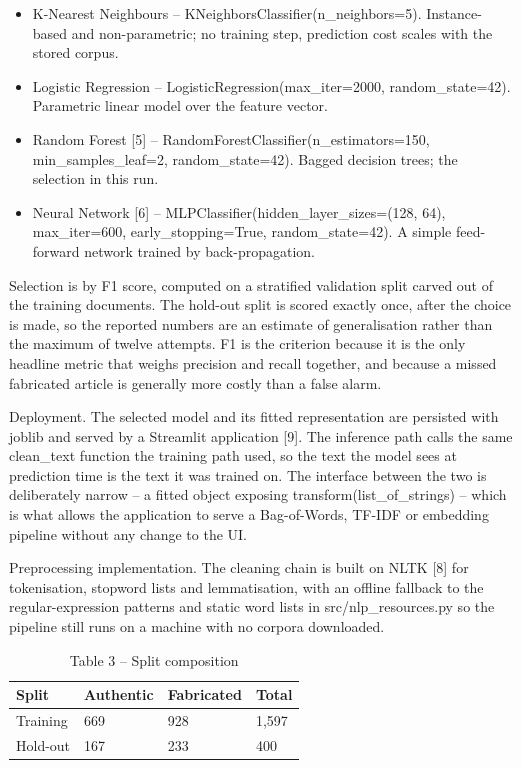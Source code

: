 \documentclass[conference,a4paper]{IEEEtran}
\begin{document}
\begin{itemize}
  \item K-Nearest Neighbours -- KNeighborsClassifier(n\_neighbors=5). Instance-based and non-parametric; no training step, prediction cost scales with the stored corpus.
  \item Logistic Regression -- LogisticRegression(max\_iter=2000, random\_state=42). Parametric linear model over the feature vector.
  \item Random Forest [5] -- RandomForestClassifier(n\_estimators=150, min\_samples\_leaf=2, random\_state=42). Bagged decision trees; the selection in this run.
  \item Neural Network [6] -- MLPClassifier(hidden\_layer\_sizes=(128, 64), max\_iter=600, early\_stopping=True, random\_state=42). A simple feed-forward network trained by back-propagation.
\end{itemize}

Selection is by F1 score, computed on a stratified validation split carved out of the training documents. The hold-out split is scored exactly once, after the choice is made, so the reported numbers are an estimate of generalisation rather than the maximum of twelve attempts. F1 is the criterion because it is the only headline metric that weighs precision and recall together, and because a missed fabricated article is generally more costly than a false alarm.

Deployment. The selected model and its fitted representation are persisted with joblib and served by a Streamlit application [9]. The inference path calls the same clean\_text function the training path used, so the text the model sees at prediction time is the text it was trained on. The interface between the two is deliberately narrow -- a fitted object exposing transform(list\_of\_strings) -- which is what allows the application to serve a Bag-of-Words, TF-IDF or embedding pipeline without any change to the UI.

Preprocessing implementation. The cleaning chain is built on NLTK [8] for tokenisation, stopword lists and lemmatisation, with an offline fallback to the regular-expression patterns and static word lists in src/nlp\_resources.py so the pipeline still runs on a machine with no corpora downloaded.

\begin{table}[!t]
  \centering
  \small
  \caption{Table 3 -- Split composition}
  \label{tab:table3splitcomposition}
  \begin{tabular}{llll}
    \toprule
    Split & Authentic & Fabricated & Total \\
    \midrule
    Training & 669 & 928 & 1,597 \\
    Hold-out & 167 & 233 & 400 \\
    \bottomrule
  \end{tabular}
\end{table}
\end{document}
